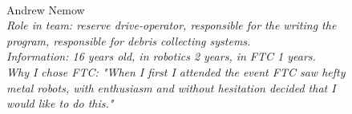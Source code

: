 \begin{figure}[H]
	\begin{minipage}{0.47\linewidth}
		\\
	\end{minipage}
	\hfill
	\begin{minipage}{0.47\linewidth}
		Andrew Nemow\\
		\emph{Role in team: reserve drive-operator, responsible for the writing the program, responsible for debris collecting systems.\\}
		\emph{Information: 16 years old, in robotics 2 years, in FTC 1 years.\\} 
		\emph{Why I chose FTC: "When I first I attended the event FTC saw hefty metal robots, with enthusiasm and without hesitation decided that I would like to do this."}				
	\end{minipage}
	\vfill
\end{figure}

